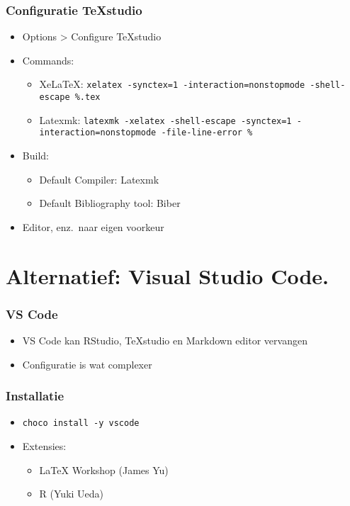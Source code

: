 \documentclass[aspectratio=169]{beamer}
\begin{document}
\begin{frame}
  \frametitle{Configuratie TeXstudio}

  \begin{itemize}
    \item Options > Configure TeXstudio
    \item Commands:
      \begin{itemize}
        \item XeLaTeX\@: \texttt{xelatex -synctex=1 -interaction=nonstopmode -shell-escape \%.tex}
        \item Latexmk: \texttt{latexmk -xelatex -shell-escape -synctex=1 -interaction=nonstopmode -file-line-error \%}
      \end{itemize}
    \item Build:
      \begin{itemize}
        \item Default Compiler: Latexmk
        \item Default Bibliography tool: Biber
      \end{itemize}
    \item Editor, enz.\ naar eigen voorkeur
  \end{itemize}

\end{frame}

\section{Alternatief: Visual Studio Code.}

\begin{frame}
  \frametitle{VS Code}

  \begin{itemize}
    \item VS Code kan RStudio, TeXstudio en Markdown editor vervangen
    \item Configuratie is wat complexer
  \end{itemize}

\end{frame}

\begin{frame}
  \frametitle{Installatie}

  \begin{itemize}
    \item \texttt{choco install -y vscode}
    \item Extensies:
      \begin{itemize}
        \item {\LaTeX} Workshop (James Yu)
        \item R (Yuki Ueda)
      \end{itemize}
  \end{itemize}

\end{frame}
\end{document}
